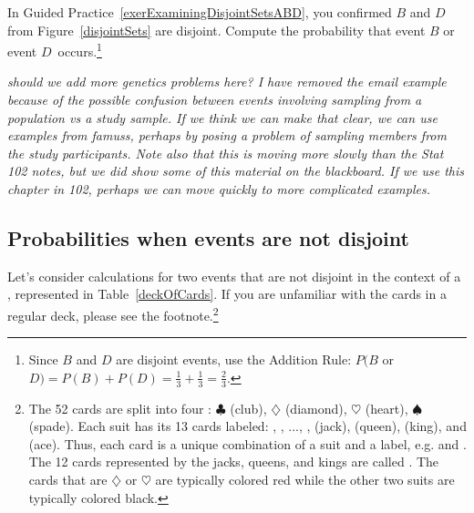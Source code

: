 \begin{exercise}
In Guided Practice~\ref{exerExaminingDisjointSetsABD}, you confirmed $B$ and $D$ from Figure~\ref{disjointSets} are disjoint. Compute the probability that event $B$ or event $D$~occurs.\footnote{Since $B$ and $D$ are disjoint events, use the Addition Rule: $P(B$ or $D) = P(B) + P(D) = \frac{1}{3} + \frac{1}{3} = \frac{2}{3}$.}
\end{exercise}

\textit{should we add more genetics problems here?  I have removed the email example because of the possible confusion between events involving sampling from a population vs a study sample.  If we think we can make that clear, we can use examples from famuss, perhaps by posing a problem of sampling members from the study participants.  Note also that this is moving more slowly than the Stat 102 notes, but we did show some of this material on the blackboard.  If we use this chapter in 102, perhaps we can move quickly to more complicated examples.}


\subsection{Probabilities when events are not disjoint}

Let's consider calculations for two events that are not disjoint in the context of a , represented in Table~\ref{deckOfCards}. If you are unfamiliar with the cards in a regular deck, please see the footnote.\footnote{The 52 cards are split into four : $\clubsuit$ (club), {\color{redcards}$\diamondsuit$} (diamond), {\color{redcards}$\heartsuit$} (heart), $\spadesuit$ (spade). Each suit has its 13 cards labeled: , , ..., ,  (jack),  (queen),  (king), and  (ace). Thus, each card is a unique combination of a suit and a label, e.g. {\color{redcards}} and . The 12 cards represented by the jacks, queens, and kings are called . The cards that are {\color{redcards}$\diamondsuit$} or {\color{redcards}$\heartsuit$} are typically colored {\color{redcards}red} while the other two suits are typically colored black.}


